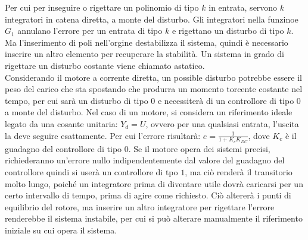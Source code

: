\documentclass{article}
\numberwithin{equation}{subsection}
\begin{document}
Per cui per inseguire o rigettare un polinomio di tipo $k$ in entrata, servono $k$ integratori in catena diretta, a monte del disturbo. Gli integratori nella funzinoe $G_1$ 
annulano l'errore per un entrata di tipo $k$ e rigettano un disturbo di tipo $k$. Ma l'inserimento di poli nell'orgine 
destabilizza il sistema, quindi è necessario inserire un altro elemento per recuperare la stabilità. Un sistema in grado di rigettare un disturbo costante viene chiamato astatico. 
\\
Considerando il motore a corrente diretta, un possible disturbo potrebbe essere il peso del carico che sta spostando che produrra un momento torcente costante nel tempo, 
per cui sarà un disturbo di tipo $0$ e necessiterà di un controllore di tipo $0$ a monte del disturbo. Nel caso di un motore, si considera un riferimento ideale legato da 
una cosante unitaria: $Y_d=U$, ovvero per una qualsiasi entrata, l'uscita la deve seguire esattamente. Per cui l'errore risultarà: $e=\displaystyle\frac{1}{1+K_cK_{DC}}$, 
dove $K_c$ è il guadagno del controllore di tipo $0$. Se il motore opera dei sistemi precisi, richiederanno un'errore nullo 
indipendentemente dal valore del guadagno del controllore quindi si userà un controllore di tpo $1$, ma ciò renderà il transitorio molto lungo, poiché un integratore 
prima di diventare utile dovrà caricarsi per un certo intervallo di tempo, prima di agire come richiesto. Ciò altererà i punti di equilibrio del rotore, ma inserire un 
altro integratore per rigettare l'errore renderebbe il sistema instabile, per cui si può alterare manualmente il riferimento iniziale su cui opera il sistema. 

\begin{center}\end{center}
\end{document}
